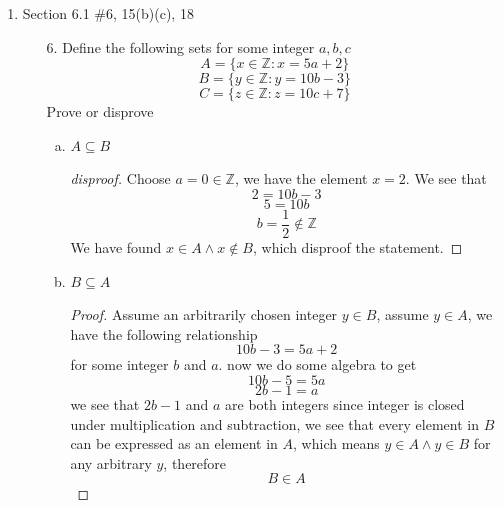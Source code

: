 \documentclass[12pt]{article}
\newcommand{\Z}{\mathbb{Z}}
\begin{document}
\begin{enumerate}
    \item Section 6.1 \#6, 15(b)(c), 18
        \begin{enumerate}
            \item[6.] Define the following sets for some integer $a,b,c$ 
                \[
                A = \{ x \in \Z : x = 5a + 2 \}
                \]
                \[
                B = \{ y \in \Z : y= 10b - 3 \}
                \]
                \[
                C = \{ z \in \Z : z= 10c + 7 \}
                \]
                Prove or disprove 
                    \begin{enumerate}[a.]
                        \item $A \subseteq B$
                            \begin{proof}[disproof]
                                Choose $a = 0 \in \Z$, we have the element $x = 2$. We see that
                                \[
                                2 = 10b - 3
                                \]
                                \[
                                5 = 10b
                                \]
                                \[
                                b=\frac{1}{2} \notin \Z
                                \]
                                We have found $x \in A \wedge x \notin B$, which disproof the statement. 
                            \end{proof}
                        \item $B \subseteq A$
                            \begin{proof}
                                Assume an arbitrarily chosen integer $y \in B$, assume $y \in A$, we have the following relationship
                                \[
                                10b-3 = 5a+2
                                \]
                                for some integer $b$ and $a.$ now we do some algebra to get
                                \[
                                10b -5 = 5a
                                \]
                                \[
                                2b - 1 = a
                                \]
                                we see that $2b-1$ and $a$ are both integers since integer is closed under multiplication and subtraction, we see that every element in $B$ can be expressed as an element in $A$, which means $y \in A \wedge y \in B$ for any arbitrary $y$, therefore 
                                \[
                                B \in A
                                \]
                                

\end{proof}
\end{enumerate}
\end{enumerate}
\end{enumerate}
\end{document}
